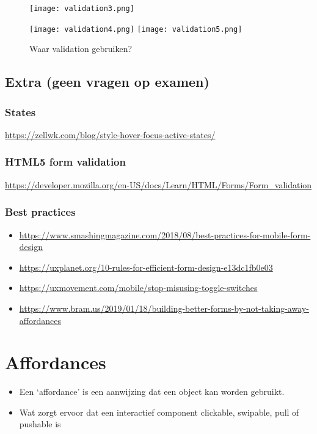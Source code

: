\documentclass{article}
\begin{document}
\begin{figure}[H]
    \centering
    \texttt{[image: validation3.png]}
    \caption{}
\end{figure}

\begin{figure}[H]
    \centering
    \texttt{[image: validation4.png]}
    \texttt{[image: validation5.png]}
    \caption{Waar validation gebruiken?}
\end{figure}


\subsection{Extra (geen vragen op examen)}
\subsubsection{States}
\url{https://zellwk.com/blog/style-hover-focus-active-states/}


\subsubsection{HTML5 form validation}
\url{https://developer.mozilla.org/en-US/docs/Learn/HTML/Forms/Form_validation}

\subsubsection{Best practices}

\begin{itemize}
    \item \url{https://www.smashingmagazine.com/2018/08/best-practices-for-mobile-form-design}
    \item \url{https://uxplanet.org/10-rules-for-efficient-form-design-e13dc1fb0e03}
    \item \url{https://uxmovement.com/mobile/stop-misusing-toggle-switches}
    \item \url{https://www.bram.us/2019/01/18/building-better-forms-by-not-taking-away-affordances}
\end{itemize}

\section{Affordances}

\begin{itemize}
    \item Een `affordance' is een aanwijzing dat een object kan worden gebruikt.
    \item Wat zorgt ervoor dat een interactief component clickable, swipable, pull of pushable is
\end{itemize}
\end{document}
